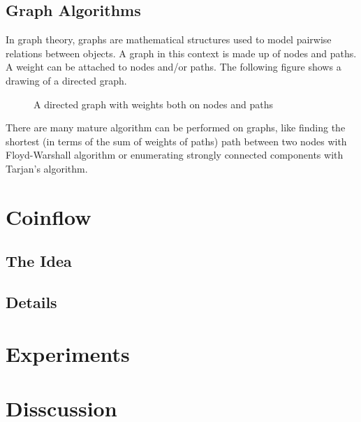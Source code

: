 \documentclass{manuscript}
\begin{document}
    \subsection{Graph Algorithms}

    In graph theory, graphs are mathematical structures used to model pairwise relations between objects. A graph in this
    context is made up of nodes and paths. A weight can be attached to nodes and/or paths. The following figure shows a
    drawing of a directed graph.

    \begin{figure}[h]
        \centering
        \caption{A directed graph with weights both on nodes and paths}\label{Fig:1}
    \end{figure}

    There are many mature algorithm can be performed on graphs, like finding the shortest (in terms of the sum of weights
    of paths) path between two nodes with Floyd-Warshall algorithm or enumerating strongly connected components with
    Tarjan's algorithm.

    \section{Coinflow}

    \subsection{The Idea}



    \subsection{Details}

    \section{Experiments}
    \section{Disscussion}


    
\end{document}
